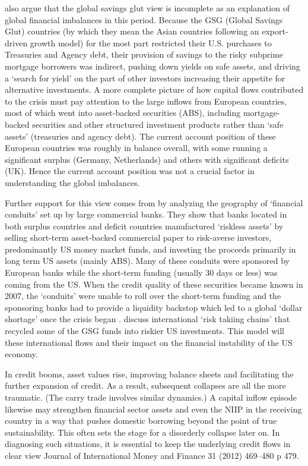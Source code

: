 \documentclass[twoside,a4paper,11pt]{article}
\begin{document}
\cite{Bertaut2012} also argue that the global savings glut view is incomplete as an explanation of global  financial  imbalances in this period. Because the GSG (Global Savings Glut) countries (by which they mean the Asian countries following an export-driven growth model) for the most part restricted their U.S. purchases to Treasuries and Agency debt, their provision of savings to the risky subprime mortgage borrowers was indirect, pushing down yields on safe assets, and driving a `search for yield' on the part of other investors increasing their appetite for alternative investments. A more complete picture of how capital flows contributed to the crisis must pay attention to the large inflows from European countries, most of which went into asset-backed securities (ABS), including mortgage-backed securities and other structured investment products rather than `safe assets' (treasuries and agency debt). The current account position of these European countries was roughly in balance overall, with some running a significant surplus (Germany, Netherlands) and others with significant deficits (UK). Hence the current account position was not a crucial factor in understanding the global imbalances.

Further support for this view comes from \cite{Acharya2010} by analyzing the geography of `financial conduits' set up by large commercial banks. They show that  banks located in both surplus countries and deficit countries manufactured `riskless assets' by selling short-term asset-backed commercial paper to risk-averse investors, predominantly US money market funds, and investing the proceeds primarily in long term US assets (mainly ABS). Many of these conduits were sponsored by European banks while the short-term funding (usually 30 days or less) was coming from the US. When the credit quality of these securities became known in 2007, the `conduits'  were unable to roll over the short-term funding and the sponsoring banks had to provide a liquidity backstop  \cite{Baba2009} which led to a global `dollar shortage' once the crisis began \cite{McGuire2009}. \cite{Brender2010} discuss international `risk takiing chains' that recycled some of the GSG funds into riskier US investments. This model will these international flows and their impact on the financial instability of the US economy.

In credit booms, asset values rise, improving balance sheets and facilitating the further expansion of credit. As a result, subsequent collapses are all the more traumatic. (The carry trade involves similar dynamics.) A capital inflow episode likewise may strengthen financial sector assets and even the NIIP in the receiving country in a way that pushes domestic borrowing beyond the point of true sustainability. This often sets the stage for a disorderly collapse later on. In diagnosing such situations, it is essential to keep the underlying credit flows in clear view  Journal of International Money and Finance 31 (2012) 469–480 p 479.
\end{document}

